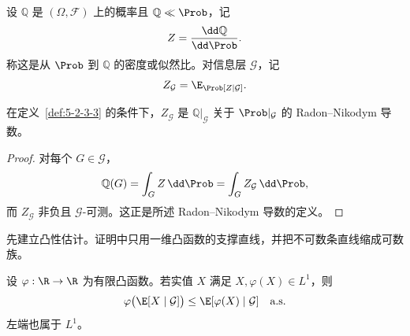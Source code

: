 \begin{definition}[换测度]\label{def:5-2-3-3}
设 $\mathbb Q$ 是 $(\Omega,\mathcal F)$ 上的概率且 $\mathbb Q\ll\Prob$，记
\[
 Z=\frac{\dd\mathbb Q}{\dd\Prob}.
\]
称这是从 $\Prob$ 到 $\mathbb Q$ 的密度或似然比。对信息层 $\mathcal G$，记
\[
 Z_{\mathcal G}=\E_\Prob[Z\mid\mathcal G].
\]
\end{definition}

\begin{proposition}[限制信息上的密度]
在定义~\ref{def:5-2-3-3} 的条件下，$Z_{\mathcal G}$ 是
$\mathbb Q|_{\mathcal G}$ 关于 $\Prob|_{\mathcal G}$ 的 Radon--Nikodym 导数。
\end{proposition}

\begin{proof}
对每个 $G\in\mathcal G$，
\[
 \mathbb Q(G)=\int_GZ\,\dd\Prob=\int_GZ_{\mathcal G}\,\dd\Prob,
\]
而 $Z_{\mathcal G}$ 非负且 $\mathcal G$-可测。这正是所述 Radon--Nikodym 导数的定义。
\end{proof}

先建立凸性估计。证明中只用一维凸函数的支撑直线，并把不可数条直线缩成可数族。

\begin{theorem}[条件 Jensen]\label{theorem:5-2-3-1}
设 $\varphi:\R\to\R$ 为有限凸函数。若实值 $X$ 满足
$X,\varphi(X)\in L^1$，则
\begin{equation}\label{eq:5-2-conditional-jensen}
 \varphi\bigl(\E[X\mid\mathcal G]\bigr)
 \leq\E[\varphi(X)\mid\mathcal G]
 \quad\text{a.s.}
\end{equation}
左端也属于 $L^1$。
\end{theorem}

